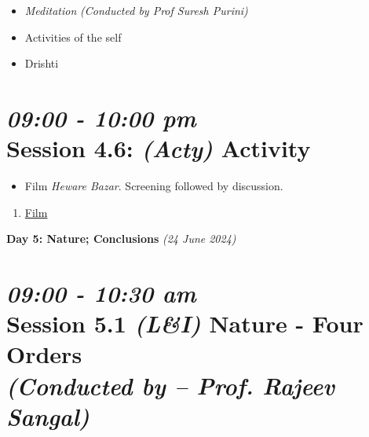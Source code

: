 \documentclass[11pt]{article}
\begin{document}
    \begin{itemize}
        \item {\em Meditation}  {\em (Conducted by Prof Suresh Purini) }    %
        \item Activities of the self
        \item Drishti
    \end{itemize}

    \section*{{\it 09:00 - 10:00 pm} \\
    Session 4.6: {\it (Acty)} Activity}

    \begin{itemize}
        \item Film {\em Heware Bazar}. Screening followed by discussion.
    \end{itemize}

    \begin{enumerate}
        \item \href{https://youtu.be/8ZuWUpHNOg0?si=2xpDFKHK86Qltsk3}{Film}
    \end{enumerate}


    \begin{center}
        \vspace{10mm}
        {\LARGE {\bf Day 5: Nature; Conclusions} {\em (24 June 2024)} }\\
    \end{center}


    \section*{{\it 09:00 - 10:30 am} \\
    Session 5.1 {\it (L\&I)} {\bf Nature - Four Orders} \\
    {\Large\it (Conducted by -- Prof. Rajeev Sangal)}}
\end{document}
